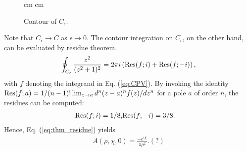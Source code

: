 \begin{figure}[h]
	 cm
	 cm
	\caption{Contour of $C_{\epsilon}$.}
	\label{fig:contour}
\end{figure}
Note that $C_{\epsilon} \rightarrow C$ as $\epsilon \rightarrow 0$. The contour integration on $C_{\epsilon}$, on the other hand, can be evaluated by residue theorem.
\begin{eqnarray}
	\oint_{C_{\epsilon}} \frac{z^2}{(z^2 + 1)^2} = 2\pi i \left( {\rm Res}(f; i) + {\rm Res}(f; -i) \right),
	\label{eq:thm_residue}
\end{eqnarray}
with $f$ denoting the integrand in Eq. (\ref{eq:CPV}). By invoking the identity ${\rm Res}(f; a) = 1/(n-1)! \lim_{z \rightarrow a} d^n (z - a)^n f(z) /dz^n$ for a pole $a$ of order $n$, the residues can be computed:
\begin{eqnarray}
	{\rm Res}(f; i) = 1/8, & {\rm Res}(f; -i) = 3/8.
	\nonumber
\end{eqnarray}
Hence, Eq. (\ref{eq:thm_residue}) yields
\begin{eqnarray}
	A(\rho, \chi, 0) = \frac{- e^{i \chi}}{\pi \rho^2}. (?)
\end{eqnarray}

